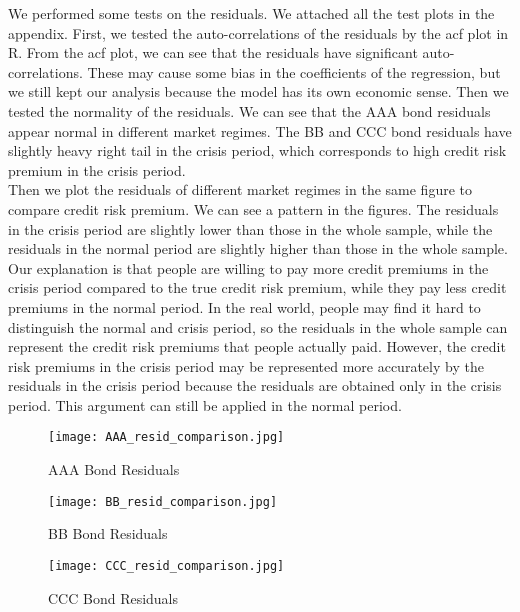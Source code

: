 \documentclass[12pt]{article}
\begin{document}
We performed some tests on the residuals. We attached all the test plots in the appendix. First, we tested the auto-correlations of the residuals by the acf plot in R. From the acf plot, we can see that the residuals have significant auto-correlations. These may cause some bias in the coefficients of the regression, but we still kept our analysis because the model has its own economic sense. Then we tested the normality of the residuals. We can see that the AAA bond residuals appear normal in different market regimes. The BB and CCC bond residuals have slightly heavy right tail in the crisis period, which corresponds to high credit risk premium in the crisis period. \\

Then we plot the residuals of different market regimes in the same figure to compare credit risk premium. We can see a pattern in the figures. The residuals in the crisis period are slightly lower than those in the whole sample, while the residuals in the normal period are slightly higher than those in the whole sample. Our explanation is that people are willing to pay more credit premiums in the crisis period compared to the true credit risk premium, while they pay less credit premiums in the normal period. In the real world, people may find it hard to distinguish the normal and crisis period, so the residuals in the whole sample can represent the credit risk premiums that people actually paid. However, the credit risk premiums in the crisis period may be represented more accurately by the residuals in the crisis period because the residuals are obtained only in the crisis period. This argument can still be applied in the normal period.

\begin{figure}[H]
\centering
\texttt{[image: AAA\_resid\_comparison.jpg]}\\
\caption{AAA Bond Residuals}
\end{figure}

\begin{figure}[H]
\centering
\texttt{[image: BB\_resid\_comparison.jpg]}\\
\caption{BB Bond Residuals}
\end{figure}

\begin{figure}[H]
\centering
\texttt{[image: CCC\_resid\_comparison.jpg]}\\
\caption{CCC Bond Residuals}
\end{figure}
\end{document}
